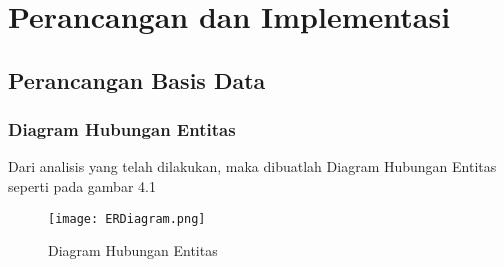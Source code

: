 \chapter{Perancangan dan Implementasi}
\label{chap:perancanganDanImplementasi}
\setcounter{secnumdepth}{3}

\paragraph{}
\section{Perancangan Basis Data}
\subsection{Diagram Hubungan Entitas}
Dari analisis yang telah dilakukan, maka dibuatlah Diagram Hubungan Entitas seperti pada gambar 4.1

\begin{figure} [H]
	\centering  
	\texttt{[image: ERDiagram.png]}  
	\caption[Diagram Hubungan Entitas]{Diagram Hubungan Entitas} 
	\label{fig:skematik-phpexcel} 
\end{figure}

